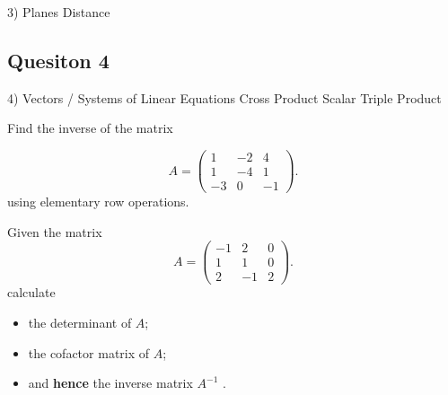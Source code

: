 \documentclass[12pt,a4paper]{article}
\begin{document}
3) Planes
	Distance
\subsection*{Quesiton 4}
4) Vectors / Systems of Linear Equations
	Cross Product
	Scalar Triple Product


 Find the inverse of the  matrix 

\begin{equation*}
A=\left( \begin{array}{rrr}
1 & -2 & 4\\
1 & -4 & 1\\
-3 & 0 & -1
\end{array} \right).
\end{equation*}
using elementary row operations.

 Given the  matrix 
\begin{equation*}
A=\left( \begin{array}{rrr}
-1 & 2 & 0\\
1 & 1 & 0\\
2 & -1 & 2
\end{array} \right).
\end{equation*}
calculate
\begin{itemize}
\item the determinant of $A$;
\item the cofactor matrix of $A$;
\item and {\bf hence} the inverse matrix $A^{-1}$ .
\end{itemize}
\end{document}
